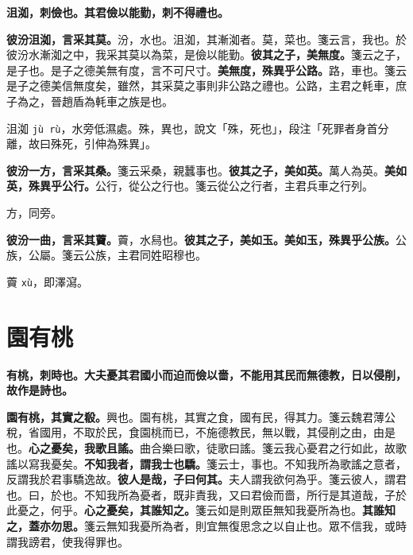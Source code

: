 \textbf{沮洳，刺儉也。其君儉以能勤，刺不得禮也。}

\textbf{彼汾沮洳，言采其莫。}{\footnotesize 汾，水也。沮洳，其漸洳者。莫，菜也。箋云言，我也。於彼汾水漸洳之中，我采其莫以為菜，是儉以能勤。}\textbf{彼其之子，美無度。}{\footnotesize 箋云之子，是子也。是子之德美無有度，言不可尺寸。}\textbf{美無度，殊異乎公路。}{\footnotesize 路，車也。箋云是子之德美信無度矣，雖然，其采莫之事則非公路之禮也。公路，主君之軞車，庶子為之，晉趙盾為軞車之族是也。}

\begin{quoting}沮洳 \texttt{jù rù}，水旁低濕處。殊，異也，說文「殊，死也」，段注「死罪者身首分離，故曰殊死，引伸為殊異」。\end{quoting}

\textbf{彼汾一方，言采其桑。}{\footnotesize 箋云采桑，親蠶事也。}\textbf{彼其之子，美如英。}{\footnotesize 萬人為英。}\textbf{美如英，殊異乎公行。}{\footnotesize 公行，從公之行也。箋云從公之行者，主君兵車之行列。}

\begin{quoting}方，同旁。\end{quoting}

\textbf{彼汾一曲，言采其藚。}{\footnotesize 藚，水舄也。}\textbf{彼其之子，美如玉。美如玉，殊異乎公族。}{\footnotesize 公族，公屬。箋云公族，主君同姓昭穆也。}

\begin{quoting}藚 \texttt{xù}，即澤瀉。\end{quoting}

\section{園有桃}


\textbf{有桃，刺時也。大夫憂其君國小而迫而儉以嗇，不能用其民而無德教，日以侵削，故作是詩也。}

\textbf{園有桃，其實之殽。}{\footnotesize 興也。園有桃，其實之食，國有民，得其力。箋云魏君薄公稅，省國用，不取於民，食園桃而已，不施德教民，無以戰，其侵削之由，由是也。}\textbf{心之憂矣，我歌且謠。}{\footnotesize 曲合樂曰歌，徒歌曰謠。箋云我心憂君之行如此，故歌謠以寫我憂矣。}\textbf{不知我者，謂我士也驕。}{\footnotesize 箋云士，事也。不知我所為歌謠之意者，反謂我於君事驕逸故。}\textbf{彼人是哉，子曰何其。}{\footnotesize 夫人謂我欲何為乎。箋云彼人，謂君也。曰，於也。不知我所為憂者，既非責我，又曰君儉而嗇，所行是其道哉，子於此憂之，何乎。}\textbf{心之憂矣，其誰知之。}{\footnotesize 箋云如是則眾臣無知我憂所為也。}\textbf{其誰知之，蓋亦勿思。}{\footnotesize 箋云無知我憂所為者，則宜無復思念之以自止也。眾不信我，或時謂我謗君，使我得罪也。}

